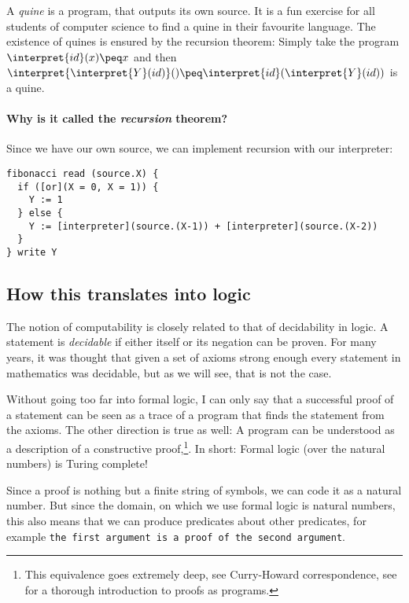 \begin{example}[Quines]
	A {\em quine} is a program, that outputs its own source. It is a fun 
	exercise for all students of computer science to find a quine in their 
	favourite language. The existence of quines is ensured by the recursion theorem:
	Simply take the program $\interpret{id}(x)\peq x$ and then 
	$\interpret{\interpret{Y}(id)}() \peq \interpret{id}(\interpret{Y}(id))$ 
	is a quine.
\end{example}

\paragraph{Why is it called the {\em recursion} theorem?}
Since we have our own source, we can implement recursion with our interpreter:
\begin{verbatim}
fibonacci read (source.X) {
  if ([or](X = 0, X = 1)) {
    Y := 1
  } else {
    Y := [interpreter](source.(X-1)) + [interpreter](source.(X-2))
  }
} write Y
\end{verbatim}

\subsection{How this translates into logic}
The notion of computability is closely related to that of decidability in 
logic. A statement is {\em decidable}\/ if either itself or its negation can be 
proven. For many years, it was thought that given a set of axioms strong 
enough every statement in mathematics was decidable, but as we will 
see, that is not the case.

Without going too far into formal logic, I can only say that a successful proof
of a statement can be seen as a trace of a program that finds the statement
from the axioms. The other direction is true as well: A program can be
understood as a description of a constructive proof,\footnote{This equivalence
	goes extremely deep, see Curry-Howard correspondence, see
	\cite{girard1989proofs} for a thorough introduction to proofs as programs.}.
	In short: Formal logic (over the natural numbers) is Turing complete!

Since a proof is nothing but a finite string of symbols, we can code it as a
natural number. But since the domain, on which we use formal logic is natural
numbers, this also means that we can produce predicates about other predicates,
for example {\tt the first argument is a proof of the second argument}.

